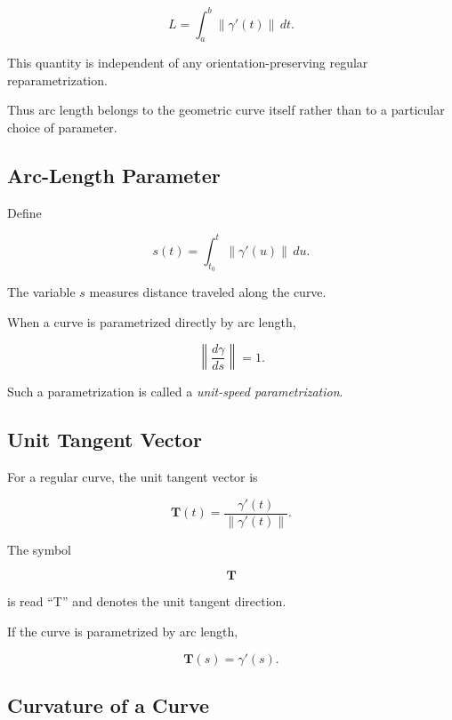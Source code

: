 \[
\boxed{
L
=
\int_a^b
\|\gamma'(t)\|\,dt.
}
\]

This quantity is independent of any orientation-preserving regular
reparametrization.

Thus arc length belongs to the geometric curve itself rather than to a
particular choice of parameter.

\subsection{Arc-Length Parameter}
\label{subsec:arc-length-parameter}

Define

\[
\boxed{
s(t)
=
\int_{t_0}^{t}
\|\gamma'(u)\|\,du.
}
\]

The variable \(s\) measures distance traveled along the curve.

When a curve is parametrized directly by arc length,

\[
\boxed{
\left\|
\frac{d\gamma}{ds}
\right\|
=1.
}
\]

Such a parametrization is called a \emph{unit-speed parametrization}.

\subsection{Unit Tangent Vector}
\label{subsec:unit-tangent-vector}

For a regular curve, the unit tangent vector is

\[
\boxed{
\mathbf{T}(t)
=
\frac{\gamma'(t)}
{\|\gamma'(t)\|}.
}
\]

The symbol

\[
\mathbf{T}
\]

is read ``T'' and denotes the unit tangent direction.

If the curve is parametrized by arc length,

\[
\boxed{
\mathbf{T}(s)=\gamma'(s).
}
\]

\subsection{Curvature of a Curve}
\label{subsec:curve-curvature}

